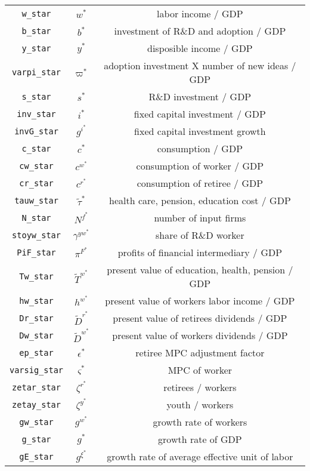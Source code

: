 \begin{center}
\begin{longtable}{ccc}
\texttt{w\_star} & ${w^*}$ & labor income / GDP\\
\texttt{b\_star} & ${b^*}$ & investment of R\&D and adoption / GDP\\
\texttt{y\_star} & ${y^*}$ & disposible income / GDP\\
\texttt{varpi\_star} & ${\varpi^*}$ & adoption investment X number of new ideas / GDP\\
\texttt{s\_star} & ${s^*}$ & R\&D investment / GDP\\
\texttt{inv\_star} & ${i^*}$ & fixed capital investment / GDP\\
\texttt{invG\_star} & ${g^i^*}$ & fixed capital investment growth\\
\texttt{c\_star} & ${c^*}$ & consumption / GDP\\
\texttt{cw\_star} & ${c^w^*}$ & consumption of worker / GDP\\
\texttt{cr\_star} & ${c^r^*}$ & consumption of retiree / GDP\\
\texttt{tauw\_star} & $\tilde{\tau}^*$ & health care, pension, education cost / GDP\\
\texttt{N\_star} & ${N^f^*}$ & number of input firms\\
\texttt{stoyw\_star} & ${\gamma^{yw}^*}$ & share of R\&D worker\\
\texttt{PiF\_star} & ${\pi^F^*}$ & profits of financial intermediary / GDP\\
\texttt{Tw\_star} & $\tilde{T}^w^*$ & present value of education, health, pension / GDP\\
\texttt{hw\_star} & ${h^w^*}$ & present value of workers labor income / GDP\\
\texttt{Dr\_star} & $\tilde{D}^r^*$ & present value of retirees dividends / GDP\\
\texttt{Dw\_star} & $\tilde{D}^w^*$ & present value of workers dividends / GDP\\
\texttt{ep\_star} & ${\epsilon^*}$ & retiree MPC adjustment factor\\
\texttt{varsig\_star} & ${\varsigma^*}$ & MPC of worker\\
\texttt{zetar\_star} & ${\zeta^r^*}$ & retirees / workers\\
\texttt{zetay\_star} & ${\zeta^y^*}$ & youth / workers\\
\texttt{gw\_star} & ${g^w^*}$ & growth rate of workers\\
\texttt{g\_star} & ${g^*}$ & growth rate of GDP\\
\texttt{gE\_star} & ${g^{\xi}^*}$ & growth rate of average effective unit of labor\\

\end{longtable}
\end{center}
